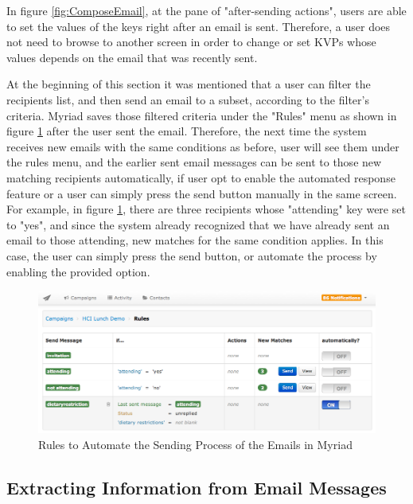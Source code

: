In figure \ref{fig:ComposeEmail}, at the pane of "after-sending actions", users are able to set the values of the keys right after an email is sent. Therefore, a user does not need to browse to another screen in order to change or set \ac{KVP}s whose values depends on the email that was recently sent.
\vspace{1cm}

At the beginning of this section it was mentioned that a user can filter the recipients list, and then send an email to a subset, according to the filter's criteria. Myriad saves those filtered criteria under the "Rules" menu as shown in figure \ref{fig:AutomatedRules} after the user sent the email. Therefore, the next time the system receives new emails with the same conditions as before, user will see them under the rules menu, and the earlier sent email messages can be sent to those new matching recipients automatically, if user opt to enable the automated response feature or a user can simply press the send button manually in the same screen. For example, in figure \ref{fig:AutomatedRules}, there are three recipients whose "attending" key were set to "yes", and since the system already recognized that we have already sent an email to those attending, new matches for the same condition applies. In this case, the user can simply press the send button, or automate the process by enabling the provided option.

\begin{figure}[htbp]
	\centering
	\includegraphics[width=1.00\textwidth]{imgs/AutomatedRules.png}
	\caption[Rules to Automate the Sending Process of the Emails in Myriad]{Rules to Automate the Sending Process of the Emails in Myriad}
	\label{fig:AutomatedRules}
\end{figure}

\subsection{Extracting Information from Email Messages}
\label{subsec:5.2.5:ExtrInfoEmaiMess}

